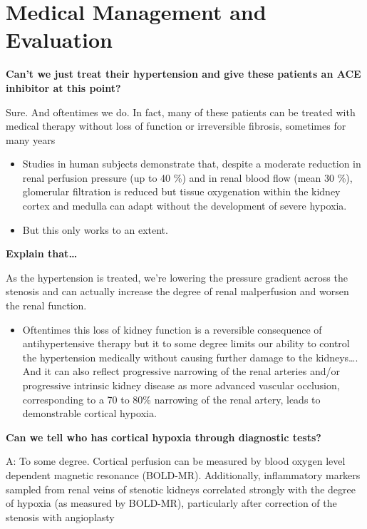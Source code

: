 \documentclass[
]{book}
\providecommand{\tightlist}{%
  \setlength{\itemsep}{0pt}\setlength{\parskip}{0pt}}
\begin{document}
\hypertarget{medical-management-and-evaluation}{%
\section{Medical Management and Evaluation}\label{medical-management-and-evaluation}}

\textbf{Can't we just treat their hypertension and give these patients an ACE
inhibitor at this point?}

Sure. And oftentimes we do. In fact, many of these patients can be
treated with medical therapy without loss of function or irreversible
fibrosis, sometimes for many years

\begin{itemize}
\item
  Studies in human subjects demonstrate that, despite a moderate
  reduction in renal perfusion pressure (up to 40 \%) and in renal
  blood flow (mean 30 \%), glomerular filtration is reduced but tissue
  oxygenation within the kidney cortex and medulla can adapt without
  the development of severe hypoxia.
\item
  But this only works to an extent.
\end{itemize}

\textbf{Explain that\ldots{}}

As the hypertension is treated, we're lowering the pressure gradient
across the stenosis and can actually increase the degree of renal
malperfusion and worsen the renal function.

\begin{itemize}
\tightlist
\item
  Oftentimes this loss of kidney function is a reversible consequence
  of antihypertensive therapy but it to some degree limits our ability
  to control the hypertension medically without causing further damage
  to the kidneys\ldots. And it can also reflect progressive narrowing of
  the renal arteries and/or progressive intrinsic kidney disease as
  more advanced vascular occlusion, corresponding to a 70 to 80\%
  narrowing of the renal artery, leads to demonstrable cortical
  hypoxia.
\end{itemize}

\textbf{Can we tell who has cortical hypoxia through diagnostic tests?}

A: To some degree. Cortical perfusion can be measured by blood oxygen
level dependent magnetic resonance (BOLD-MR). Additionally, inflammatory
markers sampled from renal veins of stenotic kidneys correlated strongly
with the degree of hypoxia (as measured by BOLD-MR), particularly after
correction of the stenosis with angioplasty
\end{document}
